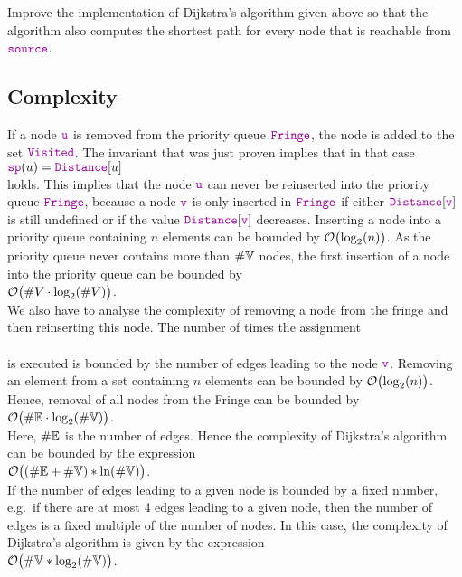 \exercise
Improve the implementation of Dijkstra's algorithm given above so that the algorithm also computes
the shortest path for every node that is reachable from $\mytt{source}$.
\eox


\subsection{Complexity}
If a node $\mytt{u}$ is removed from the priority queue $\mytt{Fringe}$, the node is added to the set
$\mytt{Visited}$.  The invariant that was just proven implies that in that case
\\[0.2cm]
\hspace*{1.3cm}
$\mytt{sp}(u) = \mytt{Distance}[u]$
\\[0.2cm]
holds.  This implies that the node $\mytt{u}$ can never be reinserted into the priority queue
$\mytt{Fringe}$, because a node $\mytt{v}$ is only inserted in $\mytt{Fringe}$ if either 
 $\mytt{Distance}[\mytt{v}]$ is still undefined or if  the  value $\mytt{Distance}[\mytt{v}]$ decreases.  
Inserting a node into a priority queue containing  $n$ elements can be bounded by
$\mathcal{O}\bigl(\log_2(n)\bigr)$.  As the priority queue never contains more than $\#{\mathbb V}$ nodes,
the first insertion of a node into the priority queue can be bounded by
\\[0.2cm]
\hspace*{1.3cm}
$\mathcal{O}\bigl(\#V \cdot \log_2(\#V)\bigr)$.
\\[0.2cm]
We also have to analyse the complexity of removing a node from the fringe and then reinserting this node.
The number of times the assignment
\\[0.2cm]
\hspace*{1.3cm}
\\[0.2cm]
is executed is bounded by the number of edges leading to the node $\mytt{v}$.
Removing an element from a set containing $n$ elements can be bounded by
 $\mathcal{O}\bigl(\log_2(n)\bigr)$.  Hence, removal of all nodes from the Fringe can be bounded by
\\[0.2cm]
\hspace*{1.3cm}
$\mathcal{O}\bigl(\#{\mathbb E} \cdot \log_2(\#{\mathbb V})\bigr)$.
\\[0.2cm]
Here,  $\#{\mathbb E}$ is the number of edges.  Hence the complexity of Dijkstra's algorithm can be
bounded by the expression \\[0.2cm]
\hspace*{1.3cm} $\mathcal{O}\bigl((\#{\mathbb E} + \#{\mathbb V}) * \ln(\#{\mathbb V})\bigr)$. \\[0.2cm]
If the number of edges leading  to a given node is bounded by a fixed number, e.g.~if there
are at most 4 edges leading to a given node, then the number of edges is a fixed multiple of the
number of nodes.  In this case, the complexity of 
 Dijkstra's algorithm is given by the expression  
\\[0.2cm]
\hspace*{1.3cm}
$\mathcal{O}\bigl(\#{\mathbb V} * \log_2(\#{\mathbb V})\bigr)$.

